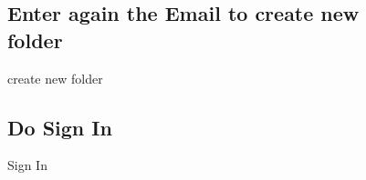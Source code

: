 \begin{figure}[h]
\subsection{Enter again the Email to create new folder}
  \centering
   \caption{create new folder}
\end{figure}

\begin{figure}[h]
\subsection{Do Sign In}
  \centering
   \caption{Sign In}
\end{figure}

